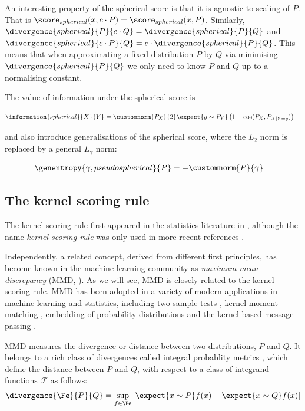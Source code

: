 An interesting property of the spherical score is that it is agnostic to scaling of $P$. That is $\score_{spherical}(x,c\cdot P) = \score_{spherical}(x,P) $. Similarly, $\divergence{spherical}{P}{c\cdot Q} = \divergence{spherical}{P}{Q}$ and $\divergence{spherical}{c\cdot P}{Q} = c \cdot \divergence{spherical}{P}{Q}$. This means that when approximating a fixed distribution $P$ by $Q$ via minimising $\divergence{spherical}{P}{Q}$ we only need to know $P$ and $Q$ up to a normalising constant.

The value of information under the spherical score is

\begin{align}
	\information{spherical}{X}{Y} &= \customnorm{P_X}{2}\expect{y \sim P_{Y}} \left( 1 - \cos(P_X,P_{X\vert Y=y}) \right)
\end{align}

\citet{Gneiting2007} and \citet{Jose2008} also introduce generalisations of the spherical score, where the $L_2$ norm is replaced by a general $L_\gamma$ norm:

\begin{align}
	\genentropy{\gamma,pseudospherical}{P} &= -\customnorm{P}{\gamma}
\end{align}

\subsection{The kernel scoring rule\label{sec:kernel_score}}

The kernel scoring rule first appeared in the statistics literature in \citep{Eaton1996}, although the name \emph{kernel scoring rule} was only used in more recent references \citep{Dawid1999,Dawid2007,Gneiting2007}.

Independently, a related concept, derived from different first principles, has become known in the machine learning community as \emph{maximum mean discrepancy} (MMD, \citep{Sriperumbudur2008}). As we will see, MMD is closely related to the kernel scoring rule. MMD has been adopted in a variety of modern applications in machine learning and statistics, including two sample tests \citep{Gretton2012}, kernel moment matching \citep{Song2008}, embedding of probability distributions \citep{Smola2007} and the kernel-based message passing \citep{Fukumizu2010}.

MMD measures the divergence or distance between two distributions, $P$ and $Q$. It belongs to a rich class of divergences called integral probablity metrics \citep{Sriperumbudur2009}, which define the distance between  $P$ and $Q$, with respect to a class of integrand functions $\mathcal{F}$ as follows:
%
\begin{align}
	\divergence{\Fe}{P}{Q} = \sup_{f\in\Fe}\left\vert \expect{x\sim P} f(x) - \expect{x\sim Q} f(x) \right\vert
\end{align}
	
